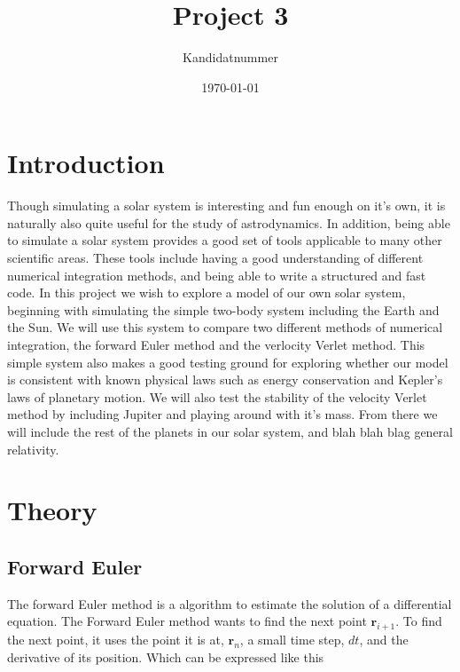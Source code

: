 \documentclass{article}
\begin{document}
\title{Project 3}
\author{Kandidatnummer}

\date{\today}

\maketitle

\begin{abstract}

\end{abstract}

\begin{multicols}{2}


\section{Introduction}

Though simulating a solar system is interesting and fun enough on it's own, it is naturally also quite useful for the study of astrodynamics. In addition, being able to simulate a solar system provides a good set of tools applicable to many other scientific areas. These tools include having a good understanding of different numerical integration methods, and being able to write a structured and fast code. In this project we wish to explore a model of our own solar system, beginning with simulating the simple two-body system including the Earth and the Sun. We will use this system to compare two different methods of numerical integration, the forward Euler method and the verlocity Verlet method. This simple system also makes a good testing ground for exploring whether our model is consistent with known physical laws such as energy conservation and Kepler's laws of planetary motion. We will also test the stability of the velocity Verlet method by including Jupiter and playing around with it's mass. From there we will include the rest of the planets in our solar system, and blah blah blag general relativity. 

\section{Theory}


\subsection{Forward Euler}
The forward Euler method is a algorithm to estimate the solution of a differential equation. The Forward Euler method wants to find the next point $\mathbf{r}_{i+1}$. To find the next point, it uses the point it is at, $\mathbf{r}_{n}$, a small time step, $dt$, and the derivative of its position. Which can be expressed like this


\end{multicols}
\end{document}
